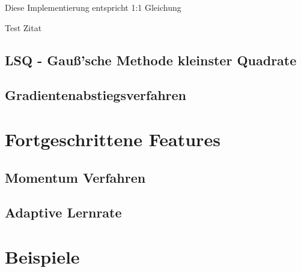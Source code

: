 \documentclass{article}
\theoremstyle{plain} %
\theoremstyle{definition} %
\begin{document}
Diese Implementierung entspricht 1:1 Gleichung 

Test Zitat \cite{Lippe}
\subsection{LSQ - Gauß'sche Methode kleinster Quadrate}
\subsection{Gradientenabstiegsverfahren}

\section{Fortgeschrittene Features}
\subsection{Momentum Verfahren}
\subsection{Adaptive Lernrate}

\section{Beispiele}



%    
%
\end{document}
